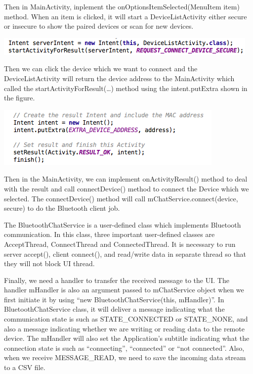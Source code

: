 \documentclass[]{article}
\begin{document}
Then in MainActivity, inplement the onOptionsItemSelected(MenuItem item) method. When an item is clicked, it will start a DeviceListActivity either secure or insecure to show the paired devices or scan for new devices.  

\includegraphics[keepaspectratio, width=\textwidth]{codeSnippet1}

Then we can click the device which we want to connect and the DeviceListActivity will return the device address to the MainActivity which called the startActivityForResult(…) method using the intent.putExtra shown in the figure.

\includegraphics[keepaspectratio, width=\textwidth]{codeSnippet2}

Then in the MainActivity, we can implement onActivityResult() method to deal with the result and call connectDevice() method to connect the Device which we selected. The connectDevice() method will call mChatService.connect(device, secure) to do the Bluetooth client job.


The BluetoothChatService is a user-defined class which implements Bluetooth communication. In this class, three important user-defined classes are AcceptThread, ConnectThread and ConnectedThread. It is necessary to run server accept(), client connect(), and read/write data in separate thread so that they will not block UI thread. 

Finally, we need a handler to transfer the received message to the UI. The handler mHandler is also an argument passed to mChatService object when we first initiate it by using “new BluetoothChatService(this, mHandler)”. In BluetoothChatService class, it will deliver a message indicating what the communication state is such as STATE\_CONNECTED or STATE\_NONE, and also a message indicating whether we are writing or reading data to the remote device. The mHandler will also set the Application’s subtitle indicating what the connection state is such as “connecting”, “connected” or “not connected”.  Also, when we receive MESSAGE\_READ, we need to save the incoming data stream to a CSV file. 
\end{document}
